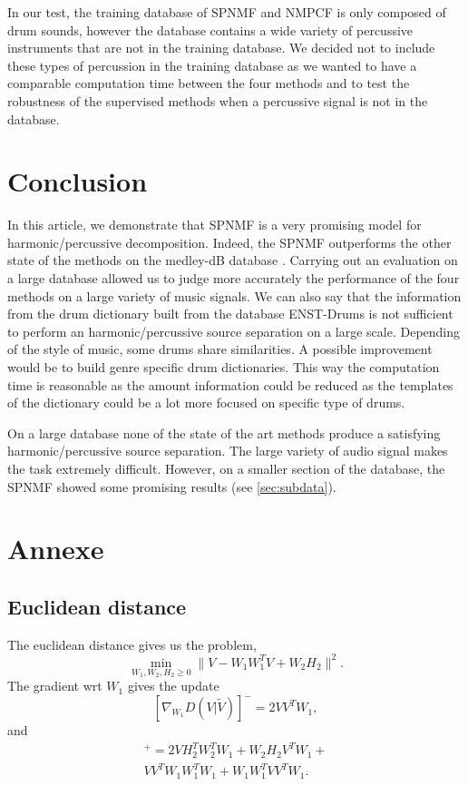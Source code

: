 \documentclass[journal]{IEEEtran}
\begin{document}
In our test, the training database of SPNMF and NMPCF is only composed of drum sounds, however the database \cite{bittner2014medleydb} contains a wide variety of percussive instruments that are not in the training database. We decided not to include these types of percussion in the training database as we wanted to have a comparable computation time between the four methods and to test the robustness of the supervised methods when a percussive signal is not in the database. 


\section{Conclusion}
\label{sec:conc}

In this article, we demonstrate that SPNMF is a very promising model for harmonic/percussive decomposition. Indeed, the SPNMF outperforms the other state of the methods on the medley-dB database \cite{bittner2014medleydb}. Carrying out an evaluation on a large database allowed us to judge more accurately the performance of the four methods on a large variety of music signals. We can also say that the information from the drum dictionary built from the database ENST-Drums \cite{gillet2006enst} is not sufficient to perform an harmonic/percussive source separation on a large scale. Depending of the style of music, some drums share similarities. A possible improvement would be to build genre specific drum dictionaries. This way the computation time is reasonable as the amount information could be reduced as the templates of the dictionary could be a lot more focused on specific type of drums. 


On a large database none of the state of the art methods produce a satisfying harmonic/percussive source separation. The large variety of audio signal makes the task extremely difficult. However, on a smaller section of the database, the SPNMF showed some promising results (see \ref{sec:subdata}).





\section*{Annexe}

\subsection{Euclidean distance}\label{euclidisteq}
The euclidean distance gives us the problem,
$$\min_{W_1,W_2,H_2 \geq 0} \|V - W_{1}W_{1}^{T}V + W_{2} H_{2} \|^2.$$
The gradient wrt $W_1$ gives the update
$$[\nabla_{W_1} D(V|\tilde{V})]^{-} = 2 VV^TW_1, $$
and
\begin{align*}
[\nabla_{W_1} D(V|\tilde{V})]^{+} = 2VH_2^TW_2^TW_1 + W_2H_2V^TW_1 + \\ VV^TW_1W_1^TW_1 + W_1W_1^TVV^TW_1.
\end{align*}
\end{document}
